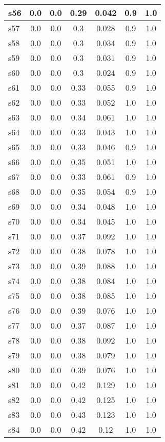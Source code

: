 \documentclass{article}
\begin{document}
\begin{tabular}{|l|c|c|c|c|c|c|}
\hline
s56 &0.0 & 0.0 & 0.29 & 0.042 & 0.9 & 1.0\\
\hline
s57 &0.0 & 0.0 & 0.3 & 0.028 & 0.9 & 1.0\\
\hline
s58 &0.0 & 0.0 & 0.3 & 0.034 & 0.9 & 1.0\\
\hline
s59 &0.0 & 0.0 & 0.3 & 0.031 & 0.9 & 1.0\\
\hline
s60 &0.0 & 0.0 & 0.3 & 0.024 & 0.9 & 1.0\\
\hline
s61 &0.0 & 0.0 & 0.33 & 0.055 & 0.9 & 1.0\\
\hline
s62 &0.0 & 0.0 & 0.33 & 0.052 & 1.0 & 1.0\\
\hline
s63 &0.0 & 0.0 & 0.34 & 0.061 & 1.0 & 1.0\\
\hline
s64 &0.0 & 0.0 & 0.33 & 0.043 & 1.0 & 1.0\\
\hline
s65 &0.0 & 0.0 & 0.33 & 0.046 & 0.9 & 1.0\\
\hline
s66 &0.0 & 0.0 & 0.35 & 0.051 & 1.0 & 1.0\\
\hline
s67 &0.0 & 0.0 & 0.33 & 0.061 & 0.9 & 1.0\\
\hline
s68 &0.0 & 0.0 & 0.35 & 0.054 & 0.9 & 1.0\\
\hline
s69 &0.0 & 0.0 & 0.34 & 0.048 & 1.0 & 1.0\\
\hline
s70 &0.0 & 0.0 & 0.34 & 0.045 & 1.0 & 1.0\\
\hline
s71 &0.0 & 0.0 & 0.37 & 0.092 & 1.0 & 1.0\\
\hline
s72 &0.0 & 0.0 & 0.38 & 0.078 & 1.0 & 1.0\\
\hline
s73 &0.0 & 0.0 & 0.39 & 0.088 & 1.0 & 1.0\\
\hline
s74 &0.0 & 0.0 & 0.38 & 0.084 & 1.0 & 1.0\\
\hline
s75 &0.0 & 0.0 & 0.38 & 0.085 & 1.0 & 1.0\\
\hline
s76 &0.0 & 0.0 & 0.39 & 0.076 & 1.0 & 1.0\\
\hline
s77 &0.0 & 0.0 & 0.37 & 0.087 & 1.0 & 1.0\\
\hline
s78 &0.0 & 0.0 & 0.38 & 0.092 & 1.0 & 1.0\\
\hline
s79 &0.0 & 0.0 & 0.38 & 0.079 & 1.0 & 1.0\\
\hline
s80 &0.0 & 0.0 & 0.39 & 0.076 & 1.0 & 1.0\\
\hline
s81 &0.0 & 0.0 & 0.42 & 0.129 & 1.0 & 1.0\\
\hline
s82 &0.0 & 0.0 & 0.42 & 0.125 & 1.0 & 1.0\\
\hline
s83 &0.0 & 0.0 & 0.43 & 0.123 & 1.0 & 1.0\\
\hline
s84 &0.0 & 0.0 & 0.42 & 0.12 & 1.0 & 1.0\\

\end{tabular}
\end{document}
